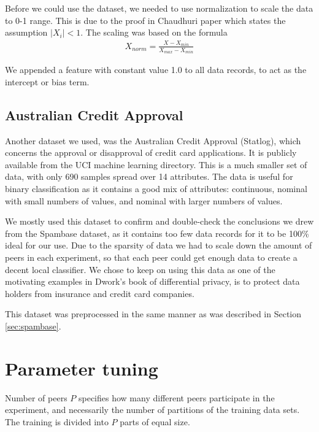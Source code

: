 Before we could use the dataset, we needed to use normalization to scale the data to 0-1 range. This is due to the proof in Chaudhuri paper which states the assumption $|X_i|< 1$. The scaling was  based on the formula
\begin{eqnarray}
	X_{norm} = \frac{X-X_{min}}{X_{max} - X_{min}}
\end{eqnarray}

We appended a feature with constant value 1.0 to all data records, to act as the intercept or bias term. 

\subsection{Australian Credit Approval}
Another dataset we used, was the Australian Credit Approval (Statlog), which concerns the approval or disapproval of credit card applications. It is publicly available from the UCI machine learning directory. This is a much smaller set of data, with only 690 samples spread over 14 attributes. The data is useful for binary classification as it contains a good mix of attributes: continuous, nominal with small numbers of values, and nominal with larger numbers of values.

We mostly used this dataset to confirm and double-check the conclusions we drew from the Spambase dataset, as it contains too few data records for it to be 100\% ideal for our use. Due to the sparsity of data we had to scale down the amount of peers in each experiment, so that each peer could get enough data to create a decent local classifier. We chose to keep on using this data as one of the motivating examples in Dwork's book\cite{dwork2013algorithmic} of differential privacy, is to protect data holders from insurance and credit card companies. 

This dataset was preprocessed in the same manner as was described in Section \ref{sec:spambase}.

\section{Parameter tuning}
\label{sec:parameter_tuning}
Number of peers $P$ specifies how many different peers participate in the experiment, and necessarily the number of partitions of the training data sets. The training is divided into $P$ parts of equal size.


